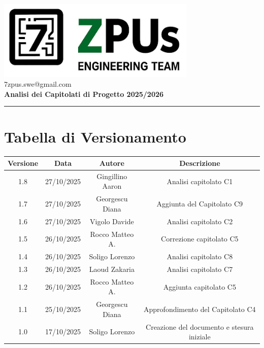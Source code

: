 \documentclass[a4paper,12pt]{article}
\begin{document}
\begin{center}
    \includegraphics[width=9.5cm]{../assets/logo7ZPUs.jpg}\\
    \small\hspace{10cm} 7zpus.swe@gmail.com\\
    \vspace{0.5cm}
    \Large \textbf{Analisi dei Capitolati di Progetto 2025/2026}\\
\end{center}

\vspace{0.3cm}
\hrule
\vspace{0.5cm}

\tableofcontents

\newpage

\section*{Tabella di Versionamento}
\begin{tabular}{|c|c|c|c|}
    \hline
    \textbf{Versione} & \textbf{Data} & \textbf{Autore} & \textbf{Descrizione}\\
    \hline
    1.8               & 27/10/2025   & Gingillino Aaron    & Analisi capitolato C1\\
    \hline 
    1.7               & 27/10/2025   & Georgescu Diana   & Aggiunta del Capitolato C9\\
    \hline
    1.6               & 27/10/2025   & Vigolo Davide  & Analisi capitolato C2\\
    \hline
    1.5               & 26/10/2025   & Rocco Matteo A.  & Correzione capitolato C5\\
    \hline
    1.4               & 26/10/2025   & Soligo Lorenzo    & Analisi capitolato C8\\
    \hline
    1.3               & 26/10/2025   & Laoud Zakaria    & Analisi capitolato C7\\
    \hline
    1.2               & 26/10/2025    & Rocco Matteo A.  & Aggiunta capitolato C5 \\
    \hline
    1.1 & 25/10/2025 & Georgescu Diana & Approfondimento del Capitolato C4 \\
    \hline
    1.0               & 17/10/2025    & Soligo Lorenzo  & Creazione del documento e stesura iniziale \\
    \hline

\end{tabular}
\end{document}
